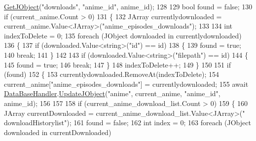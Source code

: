 \begin{DoxyCode}
      \mbox{\hyperlink{interface_little_weeb_library_1_1_handlers_1_1_i_data_base_handler_a6586c4d1cfebdb8d5d40bc544d51914c}{GetJObject}}(\textcolor{stringliteral}{"downloads"}, \textcolor{stringliteral}{"anime\_id"}, anime\_id);
128 
129             \textcolor{keywordtype}{bool} found = \textcolor{keyword}{false};
130             \textcolor{keywordflow}{if} (current\_anime.Count > 0)
131             \{
132                 JArray currentlydownloaded = current\_anime.Value<JArray>(\textcolor{stringliteral}{"anime\_episodes\_downloads"});
133 
134                 \textcolor{keywordtype}{int} indexToDelete = 0;
135                 \textcolor{keywordflow}{foreach} (JObject downloaded \textcolor{keywordflow}{in} currentlydownloaded)
136                 \{
137                     \textcolor{keywordflow}{if} (downloaded.Value<\textcolor{keywordtype}{string}>(\textcolor{stringliteral}{"id"}) == id)
138                     \{
139                         found = \textcolor{keyword}{true};
140                         \textcolor{keywordflow}{break};
141                     \}
142 
143                     \textcolor{keywordflow}{if} (downloaded.Value<\textcolor{keywordtype}{string}>(\textcolor{stringliteral}{"filepath"}) == id)
144                     \{
145                         found = \textcolor{keyword}{true};
146                         \textcolor{keywordflow}{break};
147                     \}
148                     indexToDelete++;
149                 \}
150 
151                 \textcolor{keywordflow}{if} (found)
152                 \{
153                     currentlydownloaded.RemoveAt(indexToDelete);
154                     current\_anime[\textcolor{stringliteral}{"anime\_episodes\_downloads"}] = currentlydownloaded;
155                     await \mbox{\hyperlink{class_little_weeb_library_1_1_handlers_1_1_file_history_handler_afe186c8ea770ecb9253a07f82f23c471}{DataBaseHandler}}.\mbox{\hyperlink{interface_little_weeb_library_1_1_handlers_1_1_i_data_base_handler_a00c429576be33aa60bdf1a88edaf88c6}{UpdateJObject}}(\textcolor{stringliteral}{"anime"}, current\_anime,
       \textcolor{stringliteral}{"anime\_id"}, anime\_id);
156 
157 
158                     \textcolor{keywordflow}{if} (current\_anime\_download\_list.Count > 0)
159                     \{
160                         JArray currentDownloaded = current\_anime\_download\_list.Value<JArray>(\textcolor{stringliteral}{"
      downloadHistorylist"});
161                         found = \textcolor{keyword}{false};
162                         \textcolor{keywordtype}{int} index = 0;
163                         \textcolor{keywordflow}{foreach} (JObject downloaded \textcolor{keywordflow}{in} currentDownloaded)

\end{DoxyCode}
